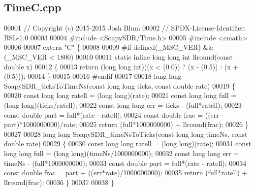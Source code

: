 \subsection{Time\+C.\+cpp}
\label{TimeC_8cpp_source}

\begin{DoxyCode}
00001 \textcolor{comment}{// Copyright (c) 2015-2015 Josh Blum}
00002 \textcolor{comment}{// SPDX-License-Identifier: BSL-1.0}
00003 
00004 \textcolor{preprocessor}{#include <SoapySDR/Time.h>}
00005 \textcolor{preprocessor}{#include <cmath>}
00006 
00007 \textcolor{keyword}{extern} \textcolor{stringliteral}{"C"} \{
00008 
00009 \textcolor{preprocessor}{#if defined(\_MSC\_VER) && (\_MSC\_VER < 1800)}
00010 
00011 \textcolor{keyword}{static} \textcolor{keyword}{inline} \textcolor{keywordtype}{long} \textcolor{keywordtype}{long} \textcolor{keywordtype}{int} llround(\textcolor{keyword}{const} \textcolor{keywordtype}{double} x)
00012 \{
00013     \textcolor{keywordflow}{return} (\textcolor{keywordtype}{long} \textcolor{keywordtype}{long} \textcolor{keywordtype}{int})((x < (0.0)) ? (x - (0.5)) : (x + (0.5)));
00014 \}
00015 
00016 \textcolor{preprocessor}{#endif}
00017 
00018 \textcolor{keywordtype}{long} \textcolor{keywordtype}{long} SoapySDR_ticksToTimeNs(\textcolor{keyword}{const} \textcolor{keywordtype}{long} \textcolor{keywordtype}{long} ticks, \textcolor{keyword}{const} \textcolor{keywordtype}{double} rate)
00019 \{
00020     \textcolor{keyword}{const} \textcolor{keywordtype}{long} \textcolor{keywordtype}{long} ratell = (\textcolor{keywordtype}{long} long)(rate);
00021     \textcolor{keyword}{const} \textcolor{keywordtype}{long} \textcolor{keywordtype}{long} full = (\textcolor{keywordtype}{long} long)(ticks/ratell);
00022     \textcolor{keyword}{const} \textcolor{keywordtype}{long} \textcolor{keywordtype}{long} err = ticks - (full*ratell);
00023     \textcolor{keyword}{const} \textcolor{keywordtype}{double} part = full*(rate - ratell);
00024     \textcolor{keyword}{const} \textcolor{keywordtype}{double} frac = ((err - part)*1000000000)/rate;
00025     \textcolor{keywordflow}{return} (full*1000000000) + llround(frac);
00026 \}
00027 
00028 \textcolor{keywordtype}{long} \textcolor{keywordtype}{long} SoapySDR_timeNsToTicks(\textcolor{keyword}{const} \textcolor{keywordtype}{long} \textcolor{keywordtype}{long} timeNs, \textcolor{keyword}{const} \textcolor{keywordtype}{double} rate)
00029 \{
00030     \textcolor{keyword}{const} \textcolor{keywordtype}{long} \textcolor{keywordtype}{long} ratell = (\textcolor{keywordtype}{long} long)(rate);
00031     \textcolor{keyword}{const} \textcolor{keywordtype}{long} \textcolor{keywordtype}{long} full = (\textcolor{keywordtype}{long} long)(timeNs/1000000000);
00032     \textcolor{keyword}{const} \textcolor{keywordtype}{long} \textcolor{keywordtype}{long} err = timeNs - (full*1000000000);
00033     \textcolor{keyword}{const} \textcolor{keywordtype}{double} part = full*(rate - ratell);
00034     \textcolor{keyword}{const} \textcolor{keywordtype}{double} frac = part + ((err*rate)/1000000000);
00035     \textcolor{keywordflow}{return} (full*ratell) + llround(frac);
00036 \}
00037 
00038 \}
\end{DoxyCode}
